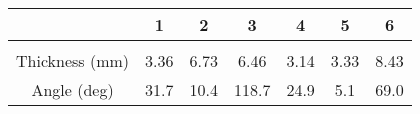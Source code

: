 \documentclass{article}
\begin{document}
    \begin{tabular}{c c c c c c c}
        \toprule
        & 1 & 2 & 3 & 4 & 5 & 6 \\ 
        \midrule\\
        \addlinespace[-2ex]
        Thickness (mm) & 3.36 & 6.73 & 6.46 & 3.14 & 3.33 & 8.43  \\
        \addlinespace[1.5ex]
        Angle (deg) & 31.7 & 10.4 & 118.7 & 24.9 & 5.1 & 69.0 \\
        \bottomrule
    \end{tabular}
\end{document}
